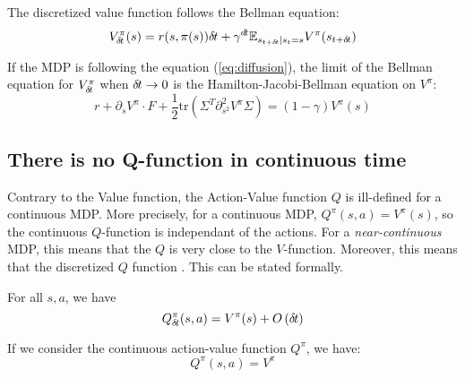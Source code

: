The discretized value function follows the Bellman equation:
\begin{equation}
  \label{eq:bellman}
  V^\pi_{\delta\hspace{-.1em}t}(s) = {r}(s, \pi(s)){\delta\hspace{-.1em}t} + \gamma^{d\hspace{-.1em}t} \mathbb{E}_{s_{t+{\delta\hspace{-.1em}t}} | s_t = s} V^\pi(s_{t+{\delta\hspace{-.1em}t}})
\end{equation}

If the MDP is following the equation (\ref{eq:diffusion}), the limit of the Bellman equation for $V^\pi_{\delta\hspace{-.1em}t}$ when ${\delta\hspace{-.1em}t} \rightarrow 0$ is the Hamilton-Jacobi-Bellman equation on $V^\pi$:
\begin{equation}
  \label{eq:hamilton-jacobi-bellman}
  r + \partial_s V^\pi \cdot F + \frac{1}{2} \text{tr}\left(\Sigma^T\partial^2_{s^2} V^\pi\Sigma\right) = (1 - \gamma) V^\pi(s)
\end{equation}


\subsection{There is no Q-function in continuous time}

Contrary to the Value function, the Action-Value function $Q$ is ill-defined for a continuous MDP. More precisely, for a continuous MDP, $Q^\pi(s, a) = V^\pi(s)$, so the continuous $Q$-function is independant of the actions. For a \emph{near-continuous} MDP, this means that the $Q$ is very close  to the $V$-function. Moreover, this means that the discretized $Q$ function . This can be stated formally.
\begin{theorem}
  For all $s, a$, we have
  \begin{equation}
    \label{eq:q-discr}
    Q^\pi_{\delta\hspace{-.1em}t}(s, a) = V^\pi(s) + O\left({\delta\hspace{-.1em}t}\right)
  \end{equation}
  
  If we consider the continuous action-value function $Q^\pi$, we have:
  \begin{equation}
    \label{eq:q-cont}
    Q^\pi(s, a) = V^\pi
  \end{equation}
  \label{th:q-cont}
\end{theorem}

